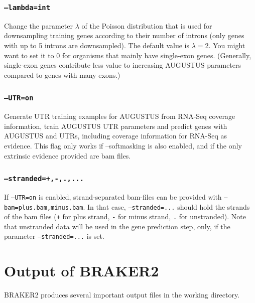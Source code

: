 \documentclass[]{article}
\begin{document}
\hypertarget{lambdaint}{\subsubsection{\texorpdfstring{\texttt{–lambda=int}}{--lambda=int}}\label{lambdaint}}

Change the parameter \(\lambda\) of the Poisson distribution that is
used for downsampling training genes according to their number of
introns (only genes with up to 5 introns are downsampled). The default
value is \(\lambda=2\). You might want to set it to 0 for organisms that
mainly have single-exon genes. (Generally, single-exon genes contribute
less value to increasing AUGUSTUS parameters compared to genes with many
exons.)

\hypertarget{utron}{\subsubsection{\texorpdfstring{\texttt{–UTR=on}}{--UTR=on}}\label{utron}}

Generate UTR training examples for AUGUSTUS from RNA-Seq coverage
information, train AUGUSTUS UTR parameters and predict genes with
AUGUSTUS and UTRs, including coverage information for RNA-Seq as
evidence. This flag only works if --softmasking is also enabled, and if
the only extrinsic evidence provided are bam files.

\hypertarget{stranded-....}{\subsubsection{\texorpdfstring{\texttt{–stranded=+,-,.,...}}{--stranded=+,-,.,...}}\label{stranded-....}}

If \texttt{–UTR=on} is enabled, strand-separated bam-files can be
provided with \texttt{–bam=plus.bam,minus.bam}. In that case,
\texttt{–stranded=...} should hold the strands of the bam files
(\texttt{+} for plus strand, \texttt{-} for minus strand, \texttt{.} for
unstranded). Note that unstranded data will be used in the gene
prediction step, only, if the parameter \texttt{–stranded=...} is set.

\hypertarget{output-of-braker2}{\section{Output of
BRAKER2}\label{output-of-braker2}}

BRAKER2 produces several important output files in the working
directory.
\end{document}
